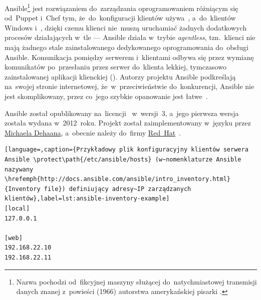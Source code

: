 \documentclass[thesis]{subfiles}
\begin{document}
Ansible\footnote{Nazwa  pochodzi od~fikcyjnej maszyny służącej do~natychmiastowej transmisji danych znanej z~powieści  (1966) autorstwa amerykańskiej pisarki .} jest rozwiązaniem do~zarządzania oprogramowaniem różniącym się od~Puppet i~Chef tym, że~do~konfiguracji klientów  używa~\ssh{}, a~do~klientów Windows  i~, dzięki czemu klienci nie~muszą uruchamiać żadnych dodatkowych procesów działających w~tle --- Ansible działa w~trybie \emph{agentless}, tzn.~klienci nie mają żadnego stale zainstalowanego dedykowanego oprogramowania do~obsługi Ansible. Komunikacja pomiędzy serwerem i~klientami odbywa się przez wymianę komunikatów \json{} po~przesłaniu przez serwer do~klienta lekkiej, tymczasowo zainstalowanej aplikacji klienckiej (). Autorzy projektu Ansible podkreślają na~swojej stronie internetowej, że~w~przeciwieństwie do~konkurencji, Ansible nie jest skomplikowany, przez co~jego szybkie opanowanie jest łatwe~\cite{ansible}.

Ansible został opublikowany na~licencji~ w~wersji~3, a~jego pierwsza wersja została wydana w~2012~roku. Projekt został zaimplementowany w~języku \python{} przez \href{http://michaeldehaan.net/}{\mbox{Michaela} \mbox{Dehaana}}, a~obecnie należy do~firmy \href{https://en.wikipedia.org/wiki/Red_Hat}{Red~Hat}~\cite{ansible-github}.


\begin{lstlisting}[language=,caption={Przykładowy plik konfiguracyjny klientów serwera Ansible \protect\path{/etc/ansible/hosts} (w~nomenklaturze Ansible nazywany \hrefemph{http://docs.ansible.com/ansible/intro_inventory.html}{Inventory file}) definiujący adresy~IP zarządzanych klientów},label=lst:ansible-inventory-example]
[local]
127.0.0.1

[web]
192.168.22.10
192.168.22.11
\end{lstlisting}
\end{document}
